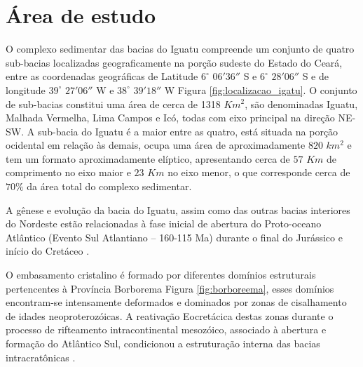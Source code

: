 \chapter{Área de estudo}
\label{capArea}
\hspace{2.0cm} O complexo sedimentar das bacias do Iguatu compreende um conjunto de quatro sub-bacias localizadas geograficamente na porção sudeste do Estado do Ceará, entre as coordenadas geográficas de Latitude $6^{\circ}$ $06' 36''$ S e $6^{\circ}$ $28' 06''$ S e de longitude $39 ^{\circ}$ $27' 06''$ W e $38^{\circ}$ $39' 18''$ W Figura \ref{fig:localizacao_igatu}.
 O conjunto de sub-bacias constitui uma área de cerca de 1318 $Km^{2}$, são denominadas Iguatu, Malhada Vermelha, Lima Campos e Icó, todas com eixo principal na direção NE-SW. A sub-bacia do Iguatu é a maior entre as quatro, está situada na porção ocidental em relação às demais, ocupa uma área de aproximadamente $820$ $km^{2}$ e tem um formato aproximadamente elíptico, apresentando cerca de $57$ $Km$ de comprimento no eixo maior e $23$ $Km$ no eixo menor, o que corresponde cerca de $70\%$ da área total do complexo sedimentar. 

A gênese e evolução da bacia do Iguatu, assim como das outras bacias interiores do Nordeste estão relacionadas à fase inicial de abertura do Proto-oceano Atlântico (Evento Sul Atlantiano – 160-115 Ma) durante o final do Jurássico e início do Cretáceo \citep{naoki2007}.

O embasamento cristalino é formado por diferentes domínios estruturais pertencentes à Província Borborema Figura \ref{fig:borboreema}, esses domínios encontram-se intensamente deformados e dominados por zonas de cisalhamento de idades neoproterozóicas. A reativação Eocretácica destas zonas durante o processo de rifteamento intracontinental mesozóico, associado à abertura e formação do Atlântico Sul, condicionou a estruturação interna das bacias intracratônicas \citep{castro99}.
 
 
 
